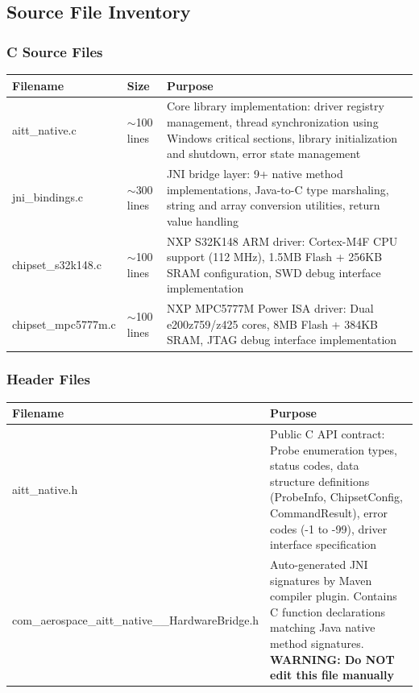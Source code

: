 \documentclass[12pt,a4paper]{article}
\begin{document}
\subsection{Source File Inventory}

\subsubsection{C Source Files}

\begin{longtable}{|p{3.5cm}|p{1.5cm}|p{7cm}|}
\hline
\textbf{Filename} & \textbf{Size} & \textbf{Purpose} \\
\hline
\endhead
\hline
\endfoot
aitt\_native.c & $\sim$100 lines & Core library implementation: driver registry management, thread synchronization using Windows critical sections, library initialization and shutdown, error state management \\
\hline
jni\_bindings.c & $\sim$300 lines & JNI bridge layer: 9+ native method implementations, Java-to-C type marshaling, string and array conversion utilities, return value handling \\
\hline
chipset\_s32k148.c & $\sim$100 lines & NXP S32K148 ARM driver: Cortex-M4F CPU support (112 MHz), 1.5MB Flash + 256KB SRAM configuration, SWD debug interface implementation \\
\hline
chipset\_mpc5777m.c & $\sim$100 lines & NXP MPC5777M Power ISA driver: Dual e200z759/z425 cores, 8MB Flash + 384KB SRAM, JTAG debug interface implementation \\
\hline
\end{longtable}

\subsubsection{Header Files}

\begin{longtable}{|p{4.5cm}|p{9cm}|}
\hline
\textbf{Filename} & \textbf{Purpose} \\
\hline
\endhead
\hline
\endfoot
aitt\_native.h & Public C API contract: Probe enumeration types, status codes, data structure definitions (ProbeInfo, ChipsetConfig, CommandResult), error codes (-1 to -99), driver interface specification \\
\hline
com\_aerospace\_aitt\_native\_\_HardwareBridge.h & Auto-generated JNI signatures by Maven compiler plugin. Contains C function declarations matching Java native method signatures. \textbf{WARNING: Do NOT edit this file manually} \\
\hline
\end{longtable}
\end{document}
